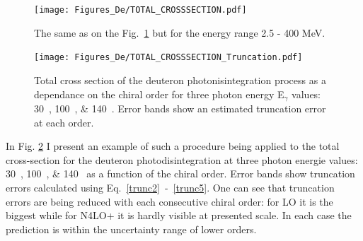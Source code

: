     
    \begin{figure}[htb!]
        \begin{center}
        \texttt{[image: Figures\_De/TOTAL\_CROSSSECTION.pdf]}
        \end{center}
        \caption{The same as on the Fig.~\ref{TOTAL_CROSS} but for the energy range 2.5 - 400 MeV.
        }
        \label{TOTAL_CROSS}
    \end{figure}

    \begin{figure}[htb!]
        \begin{center}
            \texttt{[image: Figures\_De/TOTAL\_CROSSSECTION\_Truncation.pdf]}
        \end{center}
        \caption{Total cross section of the deuteron photonisintegration
        process as a dependance on the chiral order for three photon energy E$_\gamma$ values: \SIlist[list-units = single]{30;100;140}{\mev}.
        Error bands show an estimated truncation error at each order.}
        \label{Trunc_100}
    \end{figure}
    
    In Fig. \ref{Trunc_100} I present 
    an example of such a procedure being applied to the
    total cross-section for the deuteron photodisintegration 
    at three photon energie values: \SIlist[list-units = single]{30;100;140}{\mev} as a function of the chiral order.
    Error bands show truncation errors calculated using Eq.~\ref{trunc2}~-~\ref{trunc5}.
    One can see that truncation errors are being reduced with each consecutive chiral order: for LO it is the biggest
    while for N4LO+ it is hardly visible at presented scale.
    In each case the prediction is within the uncertainty range of lower orders.
    

